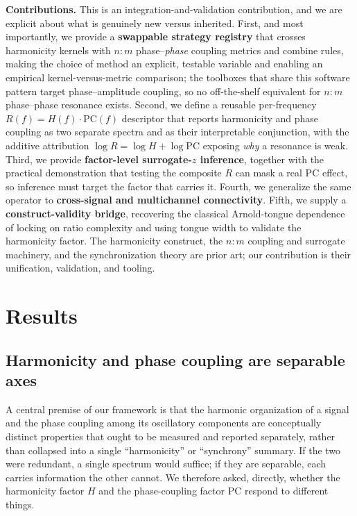 \documentclass[11pt]{article}
\begin{document}
\textbf{Contributions.} This is an integration-and-validation contribution, and we are explicit about what is genuinely new versus inherited. First, and most importantly, we provide a \textbf{swappable strategy registry} that crosses harmonicity kernels with $n{:}m$ phase--\emph{phase} coupling metrics and combine rules, making the choice of method an explicit, testable variable and enabling an empirical kernel-versus-metric comparison; the toolboxes that share this software pattern target phase--amplitude coupling, so no off-the-shelf equivalent for $n{:}m$ phase--phase resonance exists. Second, we define a reusable per-frequency \textbf{$R(f) = H(f)\cdot\mathrm{PC}(f)$} descriptor that reports harmonicity and phase coupling as two separate spectra and as their interpretable conjunction, with the additive attribution $\log R = \log H + \log \mathrm{PC}$ exposing \emph{why} a resonance is weak. Third, we provide \textbf{factor-level surrogate-$z$ inference}, together with the practical demonstration that testing the composite $R$ can mask a real $\mathrm{PC}$ effect, so inference must target the factor that carries it. Fourth, we generalize the same operator to \textbf{cross-signal and multichannel connectivity}. Fifth, we supply a \textbf{construct-validity bridge}, recovering the classical Arnold-tongue dependence of locking on ratio complexity and using tongue width to validate the harmonicity factor. The harmonicity construct, the $n{:}m$ coupling and surrogate machinery, and the synchronization theory are prior art; our contribution is their unification, validation, and tooling.

\section{Results}

\subsection{Harmonicity and phase coupling are separable axes}
A central premise of our framework is that the harmonic organization of a signal and the phase coupling among its oscillatory components are conceptually distinct properties that ought to be measured and reported separately, rather than collapsed into a single ``harmonicity'' or ``synchrony'' summary. If the two were redundant, a single spectrum would suffice; if they are separable, each carries information the other cannot. We therefore asked, directly, whether the harmonicity factor $H$ and the phase-coupling factor $\mathrm{PC}$ respond to different things.
\end{document}
